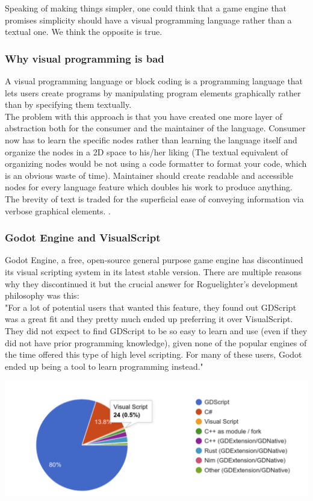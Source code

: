 \documentclass{article}
\begin{document}
Speaking of making things simpler, one could think that a game engine that promises simplicity should have a visual programming language rather than a textual one. We think the opposite is true.

\subsubsection{Why visual programming is bad}
A visual programming language or block coding is a programming language that lets users create programs by manipulating program elements graphically rather than by specifying them textually.\\

The problem with this approach is that you have created one more layer of abstraction both for the consumer and the maintainer of the language. Consumer now has to learn the specific nodes rather than learning the language itself and organize the nodes in a 2D space to his/her liking (The textual equivalent of organizing nodes would be not using a code formatter to format your code, which is an obvious waste of time). Maintainer should create readable and accessible nodes for every language feature which doubles his work to produce anything. The brevity of text is traded for the superficial ease of conveying information via verbose graphical elements. .

\subsubsection{Godot Engine and VisualScript}
Godot Engine, a free, open-source general purpose game engine has discontinued its visual scripting system in its latest stable version. There are multiple reasons why they discontinued it but the crucial answer for Roguelighter's development philosophy was this:\\

"For a lot of potential users that wanted this feature, they found out GDScript was a great fit and they pretty much ended up preferring it over VisualScript. They did not expect to find GDScript to be so easy to learn and use (even if they did not have prior programming knowledge), given none of the popular engines of the time offered this type of high level scripting. For many of these users, Godot ended up being a tool to learn programming instead."

\begin{minipage}{\linewidth}
    \centering
    \includegraphics[width=1\textwidth]{godot-statistics.png}
\end{minipage}\\\\
\end{document}
